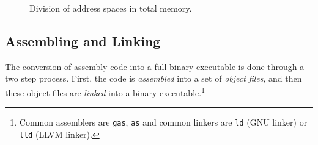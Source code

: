   \begin{figure}[H]
    \centering 
    \caption{Division of address spaces in total memory.} 
  \end{figure}

\subsection{Assembling and Linking}

  The conversion of assembly code into a full binary executable is done through a two step process. First, the code is \textit{assembled} into a set of \textit{object files}, and then these object files are \textit{linked} into a binary executable.\footnote{Common assemblers are \texttt{gas}, \texttt{as} and common linkers are \texttt{ld} (GNU linker) or \texttt{lld} (LLVM linker).}

